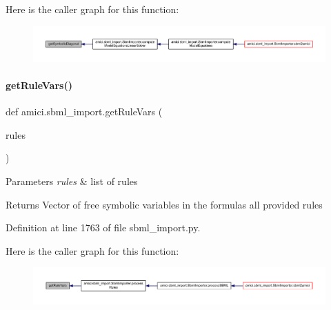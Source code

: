 Here is the caller graph for this function\+:
\nopagebreak
\begin{figure}[H]
\begin{center}
\leavevmode
\includegraphics[width=350pt]{namespaceamici_1_1sbml__import_a1d4d368d095429428738451ae90d911f_icgraph}
\end{center}
\end{figure}
\mbox{\label{namespaceamici_1_1sbml__import_a64a5d0187cb4b3f69bceceb7d5638691}} 
\paragraph{\texorpdfstring{get\+Rule\+Vars()}{getRuleVars()}}
{\footnotesize\ttfamily def amici.\+sbml\+\_\+import.\+get\+Rule\+Vars (\begin{DoxyParamCaption}\item[{}]{rules }\end{DoxyParamCaption})}


\begin{DoxyParams}{Parameters}
{\em rules} & list of rules\\
\hline
\end{DoxyParams}
\begin{DoxyReturn}{Returns}
Vector of free symbolic variables in the formulas all provided rules 
\end{DoxyReturn}


Definition at line 1763 of file sbml\+\_\+import.\+py.

Here is the caller graph for this function\+:
\nopagebreak
\begin{figure}[H]
\begin{center}
\leavevmode
\includegraphics[width=350pt]{namespaceamici_1_1sbml__import_a64a5d0187cb4b3f69bceceb7d5638691_icgraph}
\end{center}
\end{figure}
\mbox{\label{namespaceamici_1_1sbml__import_aaba72ac8b7d363e7720f36495ccc3285}} 

